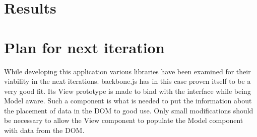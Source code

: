 \section{Results}

\section{Plan for next iteration \todo{\dots}}
While developing this application various libraries have been examined for
their viability in the next iterations. backbone.js has in this case proven
itself to be a very good fit. Its View prototype is made to bind with the
interface while being Model aware. Such a component is what is needed to put the
information about the placement of data in the DOM to good use. Only small
modifications should be necessary to allow the View component to populate the
Model component with data from the DOM.
